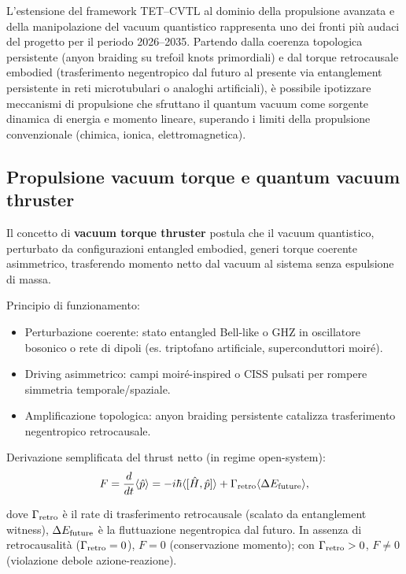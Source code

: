 \documentclass[11pt,a4paper]{article}
\theoremstyle{plain}
\theoremstyle{definition}
\begin{document}
L’estensione del framework TET–CVTL al dominio della propulsione avanzata e della manipolazione del vacuum quantistico rappresenta uno dei fronti più audaci del progetto per il periodo 2026–2035. Partendo dalla coerenza topologica persistente (anyon braiding su trefoil knots primordiali) e dal torque retrocausale embodied (trasferimento negentropico dal futuro al presente via entanglement persistente in reti microtubulari o analoghi artificiali), è possibile ipotizzare meccanismi di propulsione che sfruttano il quantum vacuum come sorgente dinamica di energia e momento lineare, superando i limiti della propulsione convenzionale (chimica, ionica, elettromagnetica).

\subsection{Propulsione vacuum torque e quantum vacuum thruster}

Il concetto di \textbf{vacuum torque thruster} postula che il vacuum quantistico, perturbato da configurazioni entangled embodied, generi torque coerente asimmetrico, trasferendo momento netto dal vacuum al sistema senza espulsione di massa.


\vspace{0.3cm}


Principio di funzionamento:
\begin{itemize}
    \item Perturbazione coerente: stato entangled Bell-like o GHZ in oscillatore bosonico o rete di dipoli (es. triptofano artificiale, superconduttori moiré).
    \item Driving asimmetrico: campi moiré-inspired o CISS pulsati per rompere simmetria temporale/spaziale.
    \item Amplificazione topologica: anyon braiding persistente catalizza trasferimento negentropico retrocausale.
\end{itemize}

Derivazione semplificata del thrust netto (in regime open-system):
\begin{equation}
    F = \frac{d}{dt} \langle \hat{p} \rangle = -i \hbar \langle [\hat{H}, \hat{p}] \rangle + \Gamma_{\rm retro} \langle \Delta E_{\rm future} \rangle,
    \label{eq:thrust_netto}
\end{equation}


\vspace{0.2cm}

dove $\Gamma_{\rm retro}$ è il rate di trasferimento retrocausale (scalato da entanglement witness), $\Delta E_{\rm future}$ è la fluttuazione negentropica dal futuro. In assenza di retrocausalità ($\Gamma_{\rm retro} = 0$), $F = 0$ (conservazione momento); con $\Gamma_{\rm retro} > 0$, $F \neq 0$ (violazione debole azione-reazione).
\end{document}
